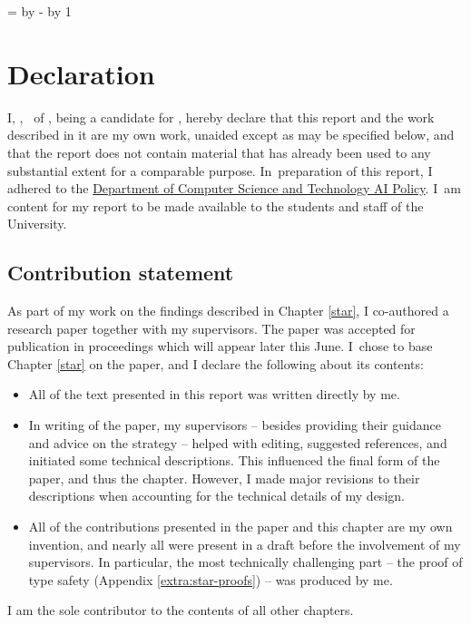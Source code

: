 \makeatletter
\@tempcnta=\relax%
\advance\@tempcnta by -%
\advance\@tempcnta by 1%
\xdef\contentpages{\the\@tempcnta}%
\makeatother

\begingroup
\onehalfspacing
\section*{Declaration}

I,
\makeatletter\ifanonymised
\candidate,
\else
\authorself{}\ of \college{},
\fi\makeatother
being a candidate for \coursefor{}, hereby declare that this report and
the work described in it are my own work, unaided except as may be
specified below, and that the report does not contain material that
has already been used to any substantial extent for a comparable
purpose.
In~preparation of this report, I adhered to the
\href{https://www.cst.cam.ac.uk/files/ai_policy.pdf}{Department of
Computer Science and Technology AI Policy}. I~am content for
my report to be made available to the students and staff of the
University.

\subsection*{Contribution statement}
As part of my work on the findings described in Chapter \ref{star}, I co-authored a research paper together with my supervisors. The paper was accepted for publication in proceedings which will appear later this June. I~chose to base Chapter \ref{star} on the paper, and I declare the following about its contents: \begin{itemize}
    \item All of the text presented in this report was written directly by me.
    \item In writing of the paper, my supervisors -- besides providing their guidance and advice on the strategy -- helped with editing, suggested references, and initiated some technical descriptions. This influenced the final form of the paper, and thus the chapter. However, I made major revisions to their descriptions when accounting for the technical details of my design. 
    \item All of the contributions presented in the paper and this chapter are my own invention, and nearly all were present in a draft before the involvement of my supervisors. In particular, the most technically challenging part -- the proof of type safety (Appendix \ref{extra:star-proofs}) -- was produced by me.
\end{itemize} 
I am the sole contributor to the contents of all other chapters.

